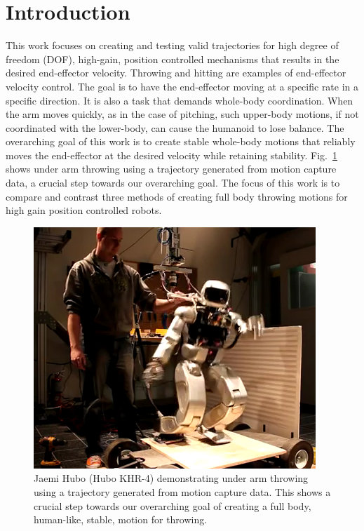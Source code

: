 \section{Introduction}

This work focuses on creating and testing valid trajectories for high degree of freedom (DOF), high-gain, position controlled mechanisms that results in the desired end-effector velocity.  Throwing and hitting are examples of end-effector velocity control.  The goal is to have the end-effector moving at a specific rate in a specific direction.  It is also a task that demands whole-body coordination.  When the arm moves quickly, as in the case of pitching, such upper-body motions, if not coordinated with the lower-body, can cause the humanoid to lose balance.  The overarching goal of this work is to create stable whole-body motions that reliably moves the end-effector at the desired velocity while retaining stability.  Fig.~\ref{fig:hubothrow} shows under arm throwing using a trajectory generated from motion capture data, a crucial step towards our overarching goal.
The focus of this work is to compare and contrast three methods of creating full body throwing motions for high gain position controlled robots.






\begin{figure}[t!]%
  \centering
\includegraphics[width=1.0\columnwidth]{./pix/huboThrow.png}
  \caption{Jaemi Hubo (Hubo KHR-4) demonstrating under arm throwing using a trajectory generated from motion capture data.  This shows a crucial step towards our overarching goal of creating a full body, human-like, stable, motion for throwing.}
  \label{fig:hubothrow}
\end{figure}





